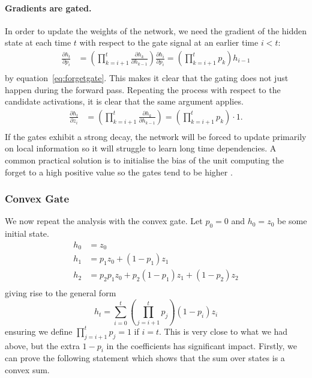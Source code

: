 \paragraph{Gradients are gated.}
In order to update the weights of the network, we need the gradient of the hidden
state at each time \(t\) with respect to the gate signal at an earlier time \(i < t\):
\begin{align}
	\frac{\partial h_t}{\partial p_i} &= 
		\left(\prod_{k=i+1}^t \frac{\partial h_k}{\partial h_{k-1}}\right) 
			\frac{\partial h_i}{\partial p_i} = 
		\left(\prod_{k=i+1}^t p_k\right)
			h_{i-1} \\
\end{align} by equation~\ref{eq:forgetgate}.
This makes it clear that the gating does not just happen during the forward pass. 
Repeating the process with respect to the candidate activations, it is clear that
the same argument applies.
\begin{align}
	\frac{\partial h_t}{\partial z_i} &= 
	\left(\prod_{k=i+1}^t \frac{\partial h_k}{\partial h_{k-1}}\right) 
	= \left(\prod_{k=i+1}^t p_k\right) \cdot
			1. \\
\end{align} If the gates
exhibit a strong decay, the network will be forced to update primarily on
local information so it will struggle to learn long time dependencies.
A common practical solution is to initialise the bias of the unit computing the forget to a high
positive value so the gates tend to be higher \autocite{Jozefowicz2015}.

\subsubsection{Convex Gate}
We now repeat the analysis with the convex gate. Let \(p_0 = 0\) and \(h_0 = z_0\) be some initial
state.
\begin{align}
	h_0 &= z_0 \\
    h_1 &= p_1z_0 + (1-p_1)z_1 \\
    h_2 &= p_2p_1z_0 + p_2(1-p_1)z_1 + (1-p_2)z_2 \\
\end{align} giving rise to the general form
\begin{equation}
	h_t = \sum_{i=0}^t \left(\prod_{j=i+1}^t p_j\right) (1 - p_i) z_i
\end{equation} ensuring we define \(\prod_{j=i+1}^tp_j = 1\) if \(i = t\).
This is very close to what we had above, but the extra \(1-p_i\) in the
coefficients has significant impact. Firstly, we can prove the following statement which shows
that the sum over states is a convex sum.


